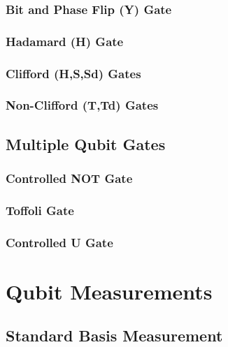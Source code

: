 \subsubsection{Bit and Phase Flip (Y) Gate}
\label{subsubsubsec:ygate}

\subsubsection{Hadamard (H) Gate}
\label{subsubsubsec:hadamardgate}

\subsubsection{Clifford (H,S,Sd) Gates}
\label{subsubsubsec:cliffordgates}

\subsubsection{Non-Clifford (T,Td) Gates}
\label{subsubsubsec:noncliffordgates}




\subsection{Multiple Qubit Gates}
\label{subsubsec:multiqubitgates}

\subsubsection{Controlled NOT Gate}
\label{subsubsubsec:cnotgate}

\subsubsection{Toffoli Gate}
\label{subsubsubsec:toffoligate}

\subsubsection{Controlled U Gate}
\label{subsubsubsec:controlledugate}


\section{Qubit Measurements}
\label{subsec:qubitmeasurements}

\subsection{Standard Basis Measurement}
\label{subsubsec:standardbasismeasurement}

